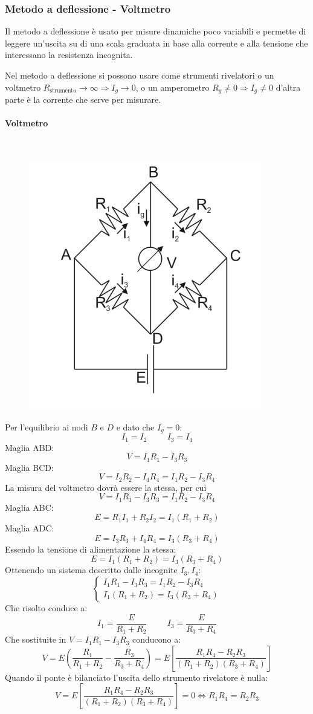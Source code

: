 \documentclass[a4paper, 15pt]{article}
\begin{document}
\subsubsection{Metodo a deflessione - Voltmetro}	
\begin{adjustwidth}{2in}{}	
		Il metodo a deflessione è usato per misure dinamiche poco variabili e permette di leggere un'uscita su di una scala graduata in base alla corrente e alla tensione che interessano la resistenza incognita. \newline
		
		Nel metodo a deflessione si possono usare come strumenti rivelatori o un voltmetro $R_{\text{strumento}}\rightarrow\infty \Rightarrow I_g\rightarrow0$, o un amperometro $R_g\ne0\Rightarrow I_g\ne0$ d'altra parte è la corrente che serve per misurare. 
		
\paragraph{Voltmetro} \mbox{} \\		
		\begin{figure}[H]
			\centering
			\includegraphics[width=0.3\linewidth]{fig/screenshot012}
			\label{fig:screenshot012}
		\end{figure}
		Per l'equilibrio ai nodi $B$ e $D$ e dato che $I_g=0$:
		\[I_1 = I_2 \hspace{1cm} I_3 = I_4\]
		Maglia ABD:
		\[V = I_1R_1 - I_3R_3\]
		Maglia BCD:
		\[V = I_2R_2-I_4R_4 = I_1R_2-I_3R_4\]
		La misura del voltmetro dovrà essere la stessa, per cui
		\[ V = I_1R_1 - I_3R_3 = I_1R_2-I_3R_4 \]
		Maglia ABC:
		\[E = R_1I_1+R_2I_2 = I_1(R_1+R_2)\]
		Maglia ADC:
		\[E = I_3R_3+I_4R_4 = I_3(R_3+R_4)\]
		Essendo la tensione di alimentazione la stessa:
		\[E = I_1(R_1+R_2) = I_3(R_3+R_4)\]
		Ottenendo un sistema descritto dalle incognite $I_3, I_4$:
		\[\begin{cases}
			I_1R_1 - I_3R_3 = I_1R_2-I_3R_4 \\
			I_1(R_1+R_2) = I_3(R_3+R_4)
		\end{cases}\]
		Che risolto conduce a:
		\[I_1 = \dfrac{E}{R_1+R_2}\hspace{1cm}I_3 = \dfrac{E}{R_3+R_4}\]
		Che sostituite in \(V = I_1R_1 - I_3R_3\) conducono a:
		\[V = E\left(\dfrac{R_1}{R_1+R_2} - \dfrac{R_3}{R_3+R_4} \right) = E\left[\dfrac{R_1R_4-R_2R_3}{(R_1+R_2)(R_3+R_4)}\right]\]
		Quando il ponte è bilanciato l'uscita dello strumento rivelatore è nulla:
		\[ V = E\left[\dfrac{R_1R_4-R_2R_3}{(R_1+R_2)(R_3+R_4)}\right] = 0 \Leftrightarrow R_1R_4=R_2R_3 \]
		

\end{adjustwidth}
\end{document}
